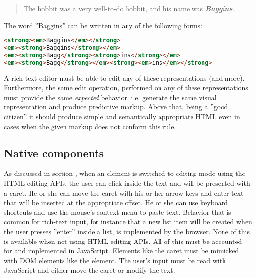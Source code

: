 \begin{quotation}
The \underline{hobbit} was a very well-to-do hobbit, and his name was \textbf{\textit{Baggins}}.
\end{quotation}

\noindent The word ''Baggins'' can be written in any of the following forms:

\begin{lstlisting}[language=html, caption=Different DOM representations of an equally formatted text, label=lst:different-dom-representations]
<strong><em>Baggins</em></strong>
<em><strong>Baggins</strong></em>
<em><strong>Bagg</strong><strong>ins</strong></em>
<em><strong>Bagg</strong></em><strong><em>ins</em></strong>
\end{lstlisting}

A rich-text editor must be able to edit any of these representations (and more). Furthermore, the same edit operation, performed on any of these representations must provide the same \textit{expected} behavior, i.e. generate the same visual representation and produce predictive markup. Above that, being a ''good citizen'' it should produce simple and semantically appropriate HTML even in cases when the given markup does not conform this rule.%




\subsection{Native components}
\label{subsec:disadv_mimic_native}

As discussed in section , when an element is switched to editing mode using the HTML editing APIs, the user can click inside the text and will be presented with a caret. He or she can move the caret with his or her arrow keys and enter text that will be inserted at the appropriate offset. He or she can use keyboard shortcuts and use the mouse's context menu to paste text. Behavior that is common for rich-text input, for instance that a new list item will be created when the user presses ''enter'' inside a list, is implemented by the browser. None of this is available when not using HTML editing APIs. All of this must be accounted for and implemented in JavaScript. Elements like the caret must be mimicked with DOM elements like the  element. The user's input must be read with JavaScript and either move the caret or modify the text.

